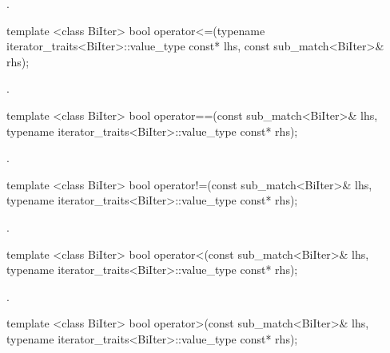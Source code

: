 \begin{itemdescr}
\pnum\returns  {}.
\end{itemdescr}

%
\begin{itemdecl}
template <class BiIter> 
  bool operator<=(typename iterator_traits<BiIter>::value_type const* lhs, 
                  const sub_match<BiIter>& rhs); 
\end{itemdecl}

\begin{itemdescr}
\pnum\returns  {}.
\end{itemdescr}

%
\begin{itemdecl}
template <class BiIter> 
  bool operator==(const sub_match<BiIter>& lhs, 
                  typename iterator_traits<BiIter>::value_type const* rhs);
\end{itemdecl}

\begin{itemdescr}
\pnum\returns  {}.
\end{itemdescr}

%
\begin{itemdecl}
template <class BiIter> 
  bool operator!=(const sub_match<BiIter>& lhs, 
                  typename iterator_traits<BiIter>::value_type const* rhs); 
\end{itemdecl}

\begin{itemdescr}
\pnum\returns  {}.
\end{itemdescr}

%
\begin{itemdecl}
template <class BiIter> 
  bool operator<(const sub_match<BiIter>& lhs, 
                 typename iterator_traits<BiIter>::value_type const* rhs); 
\end{itemdecl}

\begin{itemdescr}
\pnum\returns  {}.
\end{itemdescr}

%
\begin{itemdecl}
template <class BiIter> 
  bool operator>(const sub_match<BiIter>& lhs, 
                 typename iterator_traits<BiIter>::value_type const* rhs); 
\end{itemdecl}

